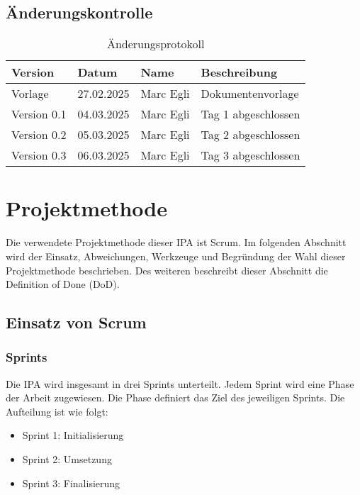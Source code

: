 \section{Änderungskontrolle}
\begin{table}[h!]
    \begin{tabular}{|L{0.2\textwidth}|L{0.2\textwidth}|L{0.2\textwidth}|L{0.3\textwidth}|}
        \color{white}Version & \color{white} Datum & \color{white} Name & \color{white} Beschreibung \\
        \hline
        Vorlage & 27.02.2025 &  Marc Egli & Dokumentenvorlage \\
        \hline
        Version 0.1 & 04.03.2025 &  Marc Egli & Tag 1 abgeschlossen \\
        \hline
        Version 0.2 & 05.03.2025 &  Marc Egli & Tag 2 abgeschlossen \\
        \hline
        Version 0.3 & 06.03.2025 &  Marc Egli & Tag 3 abgeschlossen \\
        \hline
      \end{tabular}
      \caption{Änderungsprotokoll}
 \end{table}

\chapter{Projektmethode}
Die verwendete Projektmethode dieser IPA ist Scrum. Im folgenden Abschnitt wird der Einsatz, Abweichungen, Werkzeuge und Begründung der Wahl
dieser Projektmethode beschrieben. Des weiteren beschreibt dieser Abschnitt die Definition of Done (DoD).

\section{Einsatz von Scrum}

\subsection{Sprints}
Die IPA wird insgesamt in drei Sprints unterteilt. Jedem Sprint wird eine Phase der Arbeit zugewiesen. Die 
Phase definiert das Ziel des jeweiligen Sprints. Die Aufteilung ist wie folgt:

\begin{itemize}
    \item Sprint 1: Initialisierung
    \item Sprint 2: Umsetzung
    \item Sprint 3: Finalisierung
\end{itemize}

